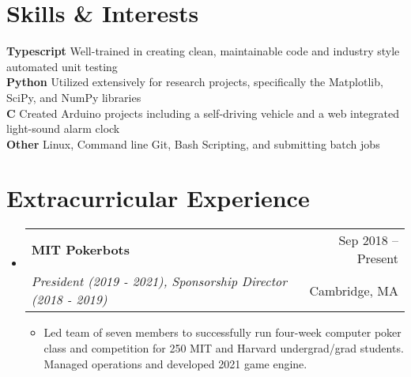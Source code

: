 \documentclass[letterpaper,11pt]{article}
\makeatletter
\newcommand{\resumeItem}[1]{
  \item\small{
    {#1 \vspace{-2pt}}
  }
}
\newcommand{\resumeSubheading}[4]{
  \vspace{-2pt}\item
    \begin{tabular*}{1.0\textwidth}[t]{l@{\extracolsep{\fill}}r}
      \textbf{#1} & {\small #2} \\
      \textit{\small#3} & {\small #4} \\
    \end{tabular*}\vspace{-7pt}
}
\newcommand{\resumeSubHeadingListStart}{\begin{itemize}[leftmargin=0.0in, label={}]}
\newcommand{\resumeSubHeadingListEnd}{\end{itemize}}
\newcommand{\resumeItemListStart}{\begin{itemize}}
\newcommand{\resumeItemListEnd}{\end{itemize}\vspace{-5pt}}
\makeatother
\begin{document}
 \section{Skills \& Interests}
  \begin{itemize}[leftmargin=0.0in, label={}]
     \small{\item{
      \textbf{Typescript} \hspace{0.3in} {Well-trained in creating clean, maintainable code and industry style automated unit testing} {\vspace{0.015in}}\\
      \textbf{Python} {\hspace{0.588in}}{Utilized extensively for research projects, specifically the Matplotlib, SciPy, and NumPy libraries} \vspace{0.015in}\\
      \textbf{C} {\hspace{0.945in}} {Created Arduino projects including a self-driving vehicle and a web integrated light-sound alarm clock} \vspace{0.015in}\\
      \textbf{Other} {\hspace{0.7025in}}{Linux, Command line Git, Bash Scripting, and submitting batch jobs} \\
     }}
  \end{itemize}



\section{Extracurricular Experience}
  \resumeSubHeadingListStart
  
    \resumeSubheading
      {MIT Pokerbots}{Sep 2018 -- Present}
      {President (2019 - 2021), Sponsorship Director (2018 - 2019)}{Cambridge, MA}
      \resumeItemListStart
        \resumeItem{Led team of seven members to successfully run four-week computer poker class and competition for 250 MIT and Harvard undergrad/grad students. Managed operations and developed 2021 game engine.}
      \resumeItemListEnd

  \resumeSubHeadingListEnd


\end{document}
